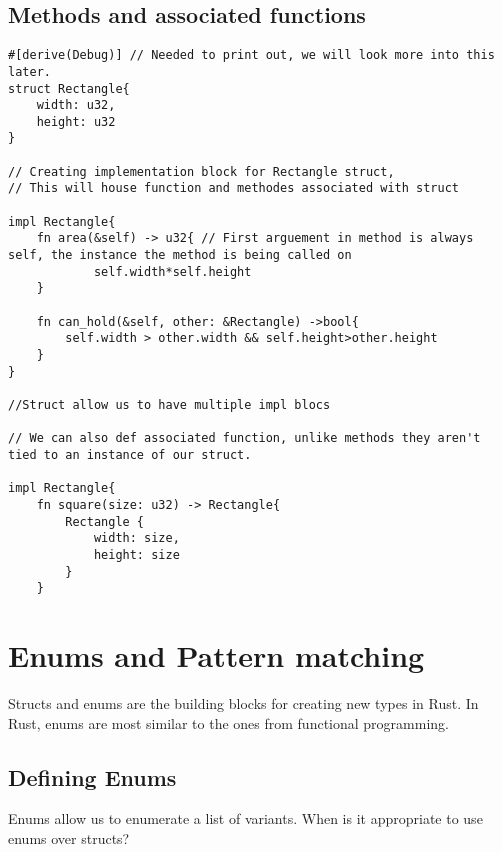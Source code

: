 \subsection{Methods and associated functions}
\begin{lstlisting}
#[derive(Debug)] // Needed to print out, we will look more into this later.
struct Rectangle{
    width: u32,
    height: u32
}

// Creating implementation block for Rectangle struct,
// This will house function and methodes associated with struct

impl Rectangle{
    fn area(&self) -> u32{ // First arguement in method is always self, the instance the method is being called on
            self.width*self.height
    }

    fn can_hold(&self, other: &Rectangle) ->bool{
        self.width > other.width && self.height>other.height
    }
}

//Struct allow us to have multiple impl blocs

// We can also def associated function, unlike methods they aren't tied to an instance of our struct.

impl Rectangle{
    fn square(size: u32) -> Rectangle{
        Rectangle { 
            width: size, 
            height: size 
        }
    }
\end{lstlisting}

\section{Enums and Pattern matching}
Structs and enums are the building blocks for creating new types in Rust. In Rust, enums are most similar to the ones from functional programming.

\subsection{Defining Enums}
Enums allow us to enumerate a list of variants. When is it appropriate to use enums over structs?

